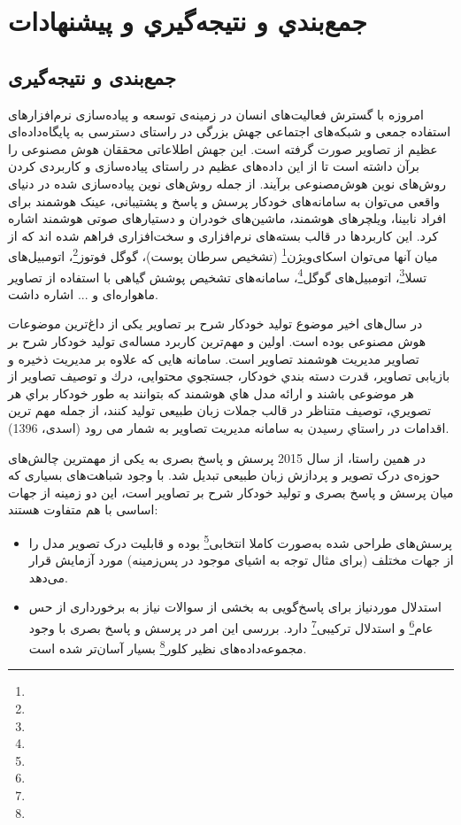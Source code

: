 \chapter{جمع‌بندي و نتيجه‌گيري و پیشنهادات}

\section{جمع‌بندی و نتیجه‌گیری}
امروزه با گسترش فعالیت‌های انسان در زمینه‌ی توسعه و پیاده‌سازی نرم‌افزار‌های استفاده جمعی و شبکه‌های اجتماعی جهش بزرگی در راستای دسترسی به پایگاه‌داده‌ای عظیم از تصاویر صورت گرفته است. این جهش اطلاعاتی محققان هوش‌ مصنوعی را برآن داشته است تا از این داده‌های عظیم در راستای پیاده‌سازی و کاربردی کردن روش‌های نوین هوش‌مصنوعی برآیند. از جمله روش‌های نوین پیاده‌سازی شده در دنیای واقعی می‌توان به سامانه‌های خودکار پرسش و پاسخ و پشتیبانی،‌ عینک‌ هوشمند برای افراد نابینا،‌ ویلچر‌های هوشمند، ماشین‌های خودران و دستیار‌های صوتی  هوشمند اشاره کرد. این کاربرد‌ها در قالب بسته‌های نرم‌افزاری و سخت‌افزاری فراهم شده اند که از میان آنها می‌توان اسکای‌ویژن\footnote{} (تشخیص سرطان پوست)، گوگل فوتوز\footnote{}، اتومبیل‌های تسلا\footnote{ }، اتومبیل‌های گوگل\footnote{}، سامانه‌های تشخیص پوشش گیاهی با استفاده از تصاویر ماهواره‌ای و ... اشاره داشت.

در سال‌های اخیر موضوع تولید خودکار شرح بر تصاویر یکی از داغ‌ترین موضوعات هوش‌ مصنوعی بوده‌ است. اولین و مهم‌ترین کاربرد مساله‌ی تولید خودکار شرح بر تصاویر مدیریت هوشمند تصاویر است. سامانه هایی که علاوه بر مدیریت ذخیره و
بازیابی تصاویر، قدرت دسته بندي خودکار، جستجوي محتوایی، درك و توصیف تصاویر از هر موضوعی باشند و ارائه مدل هاي هوشمند که بتوانند به طور خودکار براي هر تصویري، توصیف متناظر در قالب جملات زبان طبیعی تولید کنند، از جمله مهم ترین اقدامات در راستاي رسیدن به سامانه مدیریت تصاویر به شمار می رود (اسدی، 1396).

در همین راستا،‌ از سال 2015 پرسش و پاسخ بصری به یکی از مهمترین چالش‌های حوزه‌ی درک تصویر و پردازش زبان طبیعی تبدیل شد. با وجود شباهت‌های بسیاری که میان پرسش و پاسخ بصری و تولید خودکار شرح بر تصاویر است، این دو زمینه از جهات اساسی با هم متفاوت هستند:

\begin{itemize}
	\item پرسش‌های طراحی‌ شده به‌صورت کاملا انتخابی\footnote{} بوده و قابلیت درک‌ تصویر مدل را از جهات مختلف (برای مثال توجه به اشیای موجود در پس‌زمینه) مورد آزمایش قرار می‌دهد.
	
	\item استدلال مورد‌نیاز برای پاسخ‌گویی به بخشی  از سوالات نیاز به برخورداری از حس عام\footnote{} و استدلال ترکیبی\footnote{} دارد. بررسی این امر در پرسش و پاسخ بصری با وجود مجموعه‌داده‌های نظیر کلور\footnote{} بسیار آسان‌تر شده است.
\end{itemize}

